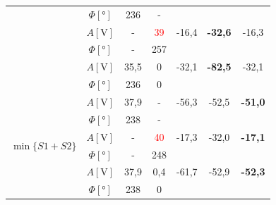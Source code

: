 \documentclass[polish,a4paper,11pt]{mwart}
\begin{document}
\begin{table}[!tbh]
\begin{tabular}{|c|c|c|c|c|c|c|}
				       &$\Phi [\si{\degree}]$ & 236 & - & \multicolumn{3}{c}{}\\\cline{2-7}
				       &   $A [\si{\V}]$ & - & \textcolor{red}{39} & -16,4 & \textbf{-32,6} & -16,3 \\\cline{2-7}
				       &$\Phi [\si{\degree}]$ & - & 257 & \multicolumn{3}{c}{}\\\cline{2-7}
				       &   $A [\si{\V}]$ & 35,5 & 0 & -32,1 & \textbf{-82,5} & -32,1\\\cline{2-7}
				       &$\Phi [\si{\degree}]$ & 236 & 0 & \multicolumn{3}{c}{}\\\hline
    \multirow{6}{*}{$\min\{S1+S2\}$}   &   $A [\si{\V}]$ & 37,9 & - & -56,3 & -52,5 & \textbf{-51,0}\\\cline{2-7}
				       &$\Phi [\si{\degree}]$ & 238 & - & \multicolumn{3}{c}{}\\\cline{2-7}
				       &   $A [\si{\V}]$ & - & \textcolor{red}{40} & -17,3 & -32,0 & \textbf{-17,1} \\\cline{2-7}
				       &$\Phi [\si{\degree}]$ & - & 248 & \multicolumn{3}{c}{}\\\cline{2-7}
				       &   $A [\si{\V}]$ & 37,9 & 0,4 & -61,7 & -52,9 & \textbf{-52,3} \\\cline{2-7}
				       &$\Phi [\si{\degree}]$ & 238 & 0 & \multicolumn{3}{c}{}\\\cline{1-4}
  \end{tabular}
\end{table}
\end{document}
